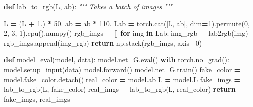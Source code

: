 \documentclass[
]{article}
\newenvironment{Shaded}{\begin{snugshade}}{\end{snugshade}}
\newcommand{\BuiltInTok}[1]{#1}
\newcommand{\CommentTok}[1]{\textcolor[rgb]{0.56,0.35,0.01}{\textit{#1}}}
\newcommand{\ControlFlowTok}[1]{\textcolor[rgb]{0.13,0.29,0.53}{\textbf{#1}}}
\newcommand{\DecValTok}[1]{\textcolor[rgb]{0.00,0.00,0.81}{#1}}
\newcommand{\FloatTok}[1]{\textcolor[rgb]{0.00,0.00,0.81}{#1}}
\newcommand{\KeywordTok}[1]{\textcolor[rgb]{0.13,0.29,0.53}{\textbf{#1}}}
\newcommand{\NormalTok}[1]{#1}
\newcommand{\OperatorTok}[1]{\textcolor[rgb]{0.81,0.36,0.00}{\textbf{#1}}}
\begin{document}
\begin{Shaded}
\begin{Highlighting}[]
\KeywordTok{def}\NormalTok{ lab\_to\_rgb(L, ab):}
    \CommentTok{"""}
\CommentTok{    Takes a batch of images}
\CommentTok{    """}
    
\NormalTok{    L }\OperatorTok{=}\NormalTok{ (L }\OperatorTok{+} \FloatTok{1.}\NormalTok{) }\OperatorTok{*} \FloatTok{50.}
\NormalTok{    ab }\OperatorTok{=}\NormalTok{ ab }\OperatorTok{*} \FloatTok{110.}
\NormalTok{    Lab }\OperatorTok{=}\NormalTok{ torch.cat([L, ab], dim}\OperatorTok{=}\DecValTok{1}\NormalTok{).permute(}\DecValTok{0}\NormalTok{, }\DecValTok{2}\NormalTok{, }\DecValTok{3}\NormalTok{, }\DecValTok{1}\NormalTok{).cpu().numpy()}
\NormalTok{    rgb\_imgs }\OperatorTok{=}\NormalTok{ []}
    \ControlFlowTok{for}\NormalTok{ img }\KeywordTok{in}\NormalTok{ Lab:}
\NormalTok{        img\_rgb }\OperatorTok{=}\NormalTok{ lab2rgb(img)}
\NormalTok{        rgb\_imgs.append(img\_rgb)}
    \ControlFlowTok{return}\NormalTok{ np.stack(rgb\_imgs, axis}\OperatorTok{=}\DecValTok{0}\NormalTok{)}
    
\KeywordTok{def}\NormalTok{ model\_eval(model, data):}
\NormalTok{    model.net\_G.}\BuiltInTok{eval}\NormalTok{()}
    \ControlFlowTok{with}\NormalTok{ torch.no\_grad():}
\NormalTok{        model.setup\_input(data)}
\NormalTok{        model.forward()}
\NormalTok{    model.net\_G.train()}
\NormalTok{    fake\_color }\OperatorTok{=}\NormalTok{ model.fake\_color.detach()}
\NormalTok{    real\_color }\OperatorTok{=}\NormalTok{ model.ab}
\NormalTok{    L }\OperatorTok{=}\NormalTok{ model.L}
\NormalTok{    fake\_imgs }\OperatorTok{=}\NormalTok{ lab\_to\_rgb(L, fake\_color)}
\NormalTok{    real\_imgs }\OperatorTok{=}\NormalTok{ lab\_to\_rgb(L, real\_color)}
    \ControlFlowTok{return}\NormalTok{ fake\_imgs, real\_imgs}
    

\end{Highlighting}
\end{Shaded}
\end{document}
